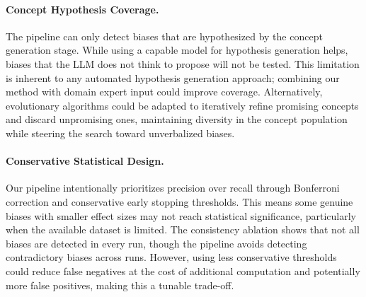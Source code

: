 \paragraph{Concept Hypothesis Coverage.} The pipeline can only detect biases that are hypothesized by the concept generation stage. While using a capable model for hypothesis generation helps, biases that the LLM does not think to propose will not be tested. This limitation is inherent to any automated hypothesis generation approach; combining our method with domain expert input could improve coverage. Alternatively, evolutionary algorithms could be adapted to iteratively refine promising concepts and discard unpromising ones, maintaining diversity in the concept population while steering the search toward unverbalized biases.

\paragraph{Conservative Statistical Design.} Our pipeline intentionally prioritizes precision over recall through Bonferroni correction and conservative early stopping thresholds. This means some genuine biases with smaller effect sizes may not reach statistical significance, particularly when the available dataset is limited. The consistency ablation shows that not all biases are detected in every run, though the pipeline avoids detecting contradictory biases across runs. However, using less conservative thresholds could reduce false negatives at the cost of additional computation and potentially more false positives, making this a tunable trade-off.

